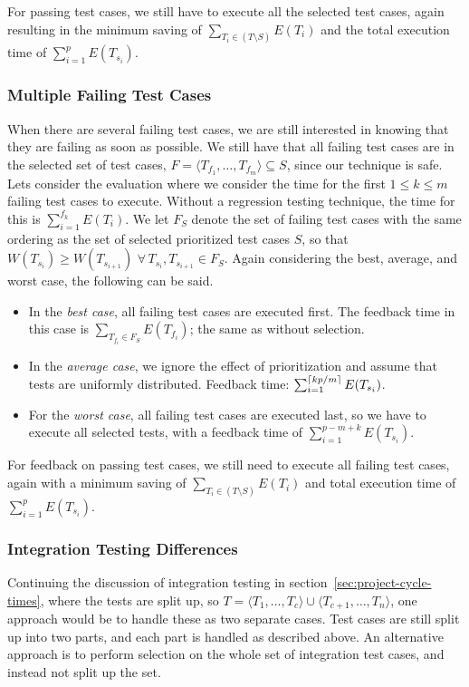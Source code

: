 \documentclass[a4paper,english,12pt]{report}
\DeclarePairedDelimiter{\ceil}{\lceil}{\rceil}
\begin{document}
For passing test cases, we still have to execute all the selected test cases, again resulting in the minimum saving of $\sum_{T_i \in (T \setminus S)} E(T_i)$ and the total execution time of $\sum_{i=1}^{p} E(T_{s_i})$.

\subsubsection{Multiple Failing Test Cases}
When there are several failing test cases, we are still interested in knowing that they are failing as soon as possible. We still have that all failing test cases are in the selected set of test cases, $F = \langle T_{f_1}, \ldots, T_{f_m} \rangle \subseteq S$, since our technique is safe. Lets consider the evaluation where we consider the time for the first $1 \leq k \leq m$ failing test cases to execute. Without a regression testing technique, the time for this is $\sum_{i=1}^{f_k} E(T_i)$. We let $F_S$ denote the set of failing test cases with the same ordering as the set of selected prioritized test cases $S$, so that $W(T_{s_i}) \geq W(T_{s_{i+1}})$ $\forall\, T_{s_i}, T_{s_{i+1}} \in F_S$. Again considering the best, average, and worst case, the following can be said.

\begin{itemize}
  \item In the \textit{best case}, all failing test cases are executed first. The feedback time in this case is $\sum_{T_{f_i} \in F_S} E(T_{f_i})$; the same as without selection.
  \item In the \textit{average case}, we ignore the effect of prioritization and assume that tests are uniformly distributed. Feedback time: $\sum_{i=1}^{\ceil{kp/m}} E(T_{s_i})$.
  \item For the \textit{worst case}, all failing test cases are executed last, so we have to execute all selected tests, with a feedback time of $\sum_{i=1}^{p-m+k} E(T_{s_i})$.
\end{itemize}

For feedback on passing test cases, we still need to execute all failing test cases, again with a minimum saving of $\sum_{T_i \in (T \setminus S)} E(T_i)$ and total execution time of $\sum_{i=1}^{p} E(T_{s_i})$.

\subsubsection{Integration Testing Differences}
Continuing the discussion of integration testing in section~\vref{sec:project-cycle-times}, where the tests are split up, so $T=\langle T_1,\ldots,T_c \rangle\cup\langle T_{c+1},\ldots,T_{n} \rangle$, one approach would be to handle these as two separate cases. Test cases are still split up into two parts, and each part is handled as described above. An alternative approach is to perform selection on the whole set of integration test cases, and instead not split up the set. 
\end{document}
